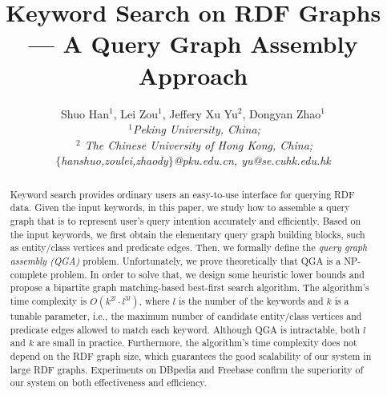 \documentclass[sigconf]{acmart}
\begin{document}
\title{Keyword Search on RDF Graphs --- A Query Graph Assembly Approach}

 \author{
	{Shuo Han{${^1}$}, Lei Zou{${^1}$}, Jeffery Xu Yu{${^2}$}, Dongyan Zhao{${^1}$}} \\
	\fontsize{10}{\baselineskip}\selectfont\itshape $~^{1}$Peking University, China;\\
	\fontsize{10}{\baselineskip}\selectfont\itshape $~^{2}$ The Chinese University of Hong Kong, China; \\
	\fontsize{9}{\baselineskip}\selectfont\ttfamily\upshape $\{$hanshuo,zoulei,zhaody$\}$@pku.edu.cn, yu@se.cuhk.edu.hk\\
}



\begin{abstract}
Keyword search provides ordinary users an easy-to-use interface for querying RDF data. Given the input keywords, in this paper, we study how to assemble a query graph that is to represent user's query intention accurately and efficiently. Based on the input keywords, we first obtain the elementary query graph building blocks, such as entity/class vertices and predicate edges. Then, we formally define the \emph{query graph assembly (QGA)} problem. Unfortunately, we prove theoretically that QGA is a NP-complete problem. In order to solve that, we design some heuristic lower bounds and propose a bipartite graph matching-based best-first search algorithm. The algorithm's time complexity is $O(k^{2l} \cdot l^{3l})$, where $l$ is the number of the keywords and $k$ is a tunable parameter, i.e., the maximum number of candidate entity/class vertices and predicate edges allowed to match each keyword. Although QGA is intractable, both $l$ and $k$ are small in practice. Furthermore, the algorithm's time complexity does not depend on the RDF graph size, which guarantees the good scalability of our system in large RDF graphs. Experiments on DBpedia and Freebase confirm the superiority of our system on both effectiveness and efficiency. 
\end{abstract}
\end{document}

